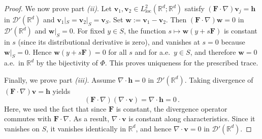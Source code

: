 \documentclass[10pt,a4paper]{amsart}
\begin{document}
\begin{proof}
We now prove part \textit{(ii)}. Let $\boldsymbol v_1,\boldsymbol v_2\in L^2_{\mathrm{loc}}(\mathbb R^d;\mathbb R^d)$ satisfy
$(\mathbf F\cdot\nabla)\boldsymbol v_j={{} \boldsymbol h}$ in $\mathcal D'(\mathbb R^d)$ and
$\boldsymbol v_1|_S=\boldsymbol v_2|_S=\boldsymbol v_S$. Set $\boldsymbol w:=\boldsymbol v_1-\boldsymbol v_2$.
Then $(\mathbf F\cdot\nabla)\boldsymbol w=0$ in $\mathcal D'(\mathbb R^d)$ and $\boldsymbol w|_S=0$.
For fixed $y\in S$, the function $s\mapsto \boldsymbol w(y+s\mathbf F)$ is constant in $s$
(since its distributional derivative is zero), and vanishes at $s=0$ because $\boldsymbol w|_S=0$.
Hence $\boldsymbol w(y+s\mathbf F)=0$ for all $s$ and for a.e.\ $y\in S$, and therefore $\boldsymbol w=0$
a.e.\ in $\mathbb R^d$ by the bijectivity of $\Phi$. This proves uniqueness for the prescribed trace.

Finally, we prove part \textit{(iii)}. Assume $\nabla\cdot\boldsymbol h=0$ in $\mathcal D'(\mathbb R^d)$. Taking divergence of
$(\mathbf F\cdot\nabla)\boldsymbol v={{} \boldsymbol h}$ yields
\[
(\mathbf F\cdot\nabla)(\nabla\cdot\boldsymbol v)={{} \nabla\cdot\boldsymbol h}=0\,.
\]
Here, we used the fact that since $\mathbf F$ is constant, the divergence operator commutes with $\mathbf F\cdot\nabla$. As a result, $\nabla\cdot\boldsymbol v$ is constant along characteristics. Since it vanishes on $S$, it vanishes identically in $\mathbb R^d$, and hence
$\nabla\cdot\boldsymbol v=0$ in $\mathcal D'(\mathbb R^d)$.
\end{proof}
\end{document}
